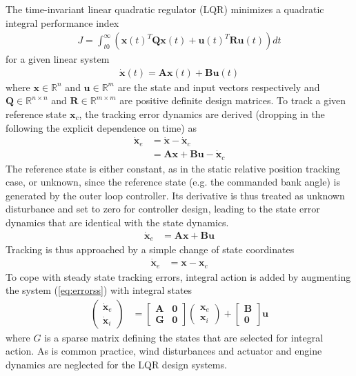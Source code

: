 \documentclass{ifacconf}
\newcommand{\mbf}[1]{\mathbf{#1}}
\providecommand{\mbf}[1]{\mathbf{#1}}
\begin{document}
\noindent
The time-invariant linear quadratic regulator (LQR) minimizes a quadratic integral performance index
\begin{align}
J = \int_{t0}^{\infty}(
\mathbf{x}(t)^T 
\mathbf{Q}
\mathbf{x}(t)
+
\mathbf{u}(t)^T 
\mathbf{R}
\mathbf{u}(t)
)
dt
\end{align}
for a given linear system
\begin{align}
\dot{\mathbf{x}}(t)
=
\mathbf{A}
\mathbf{x}(t)
+
\mathbf{B}
\mathbf{u}(t)
\end{align}
where $\mathbf{x} \in \mathbb{R}^n$ and $\mathbf{u} \in \mathbb{R}^m$ are the state and input vectors respectively and $\mathbf{Q} \in \mathbb{R}^{n\times n}$ and $\mathbf{R} \in \mathbb{R}^{m\times m}$ are positive definite design matrices.
To track a given reference state $\mbf{x}_c$, the tracking error dynamics are derived (dropping in the following the explicit dependence on time) as
\begin{align}
\dot{\mathbf{x}}_e
&=
\dot{\mbf{x}}
-
\dot{\mathbf{x}}_c \\
{}
&=
\mathbf{A}
\mathbf{x}
+
\mathbf{B}
\mathbf{u}
-
\dot{\mathbf{x}}_c 
\end{align}
The reference state is either constant, as in the static relative position tracking case, or unknown, since the reference state (e.g. the commanded bank angle) is generated by the outer loop controller. Its derivative is thus treated as unknown disturbance and set to zero for controller design, leading to the state error dynamics
that are identical with the state dynamics. 
\begin{align}
\dot{\mathbf{x}}_e
&=
\mathbf{A}
\mathbf{x}
+
\mathbf{B}
\mbf{u}
\end{align}
Tracking is thus approached by a simple change of state coordinates
\begin{align}
\dot{\mbf{x}}_e
&=
{\mbf{x}}
-
{\mbf{x}}_c 
\label{eq:errorss}
\end{align}
To cope with steady state tracking errors, integral action is added by augmenting the system (\ref{eq:errorss}) with integral states
\begin{align}
\begin{pmatrix}
\dot{\mbf{x}}_e \\
\dot{\mbf{x}}_i
\end{pmatrix}
&=
\begin{bmatrix}
\mbf{A} & \mbf{0} \\
\mbf{G} & \mbf{0}
\end{bmatrix}
\begin{pmatrix}
\mbf{x}_e \\
\mbf{x}_i
\end{pmatrix}
+
\begin{bmatrix}
\mbf{B} \\
\mbf{0}
\end{bmatrix}
\mbf{u}
\label{eq:integerrorss}
\end{align}
where $G$ is a sparse matrix defining the states that are selected for integral action. As is common practice, wind disturbances and actuator and engine dynamics are neglected for the LQR design systems. 
\end{document}
